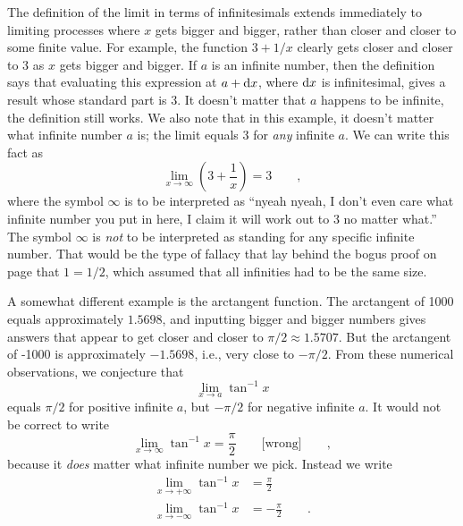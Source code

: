 The definition of the limit in terms of infinitesimals extends immediately to limiting
processes where $x$ gets bigger and bigger, rather than closer and closer to some
finite value. For example, the function $3+1/x$ clearly gets closer and closer to
3 as $x$ gets bigger and bigger. If $a$ is an infinite number, then the definition
says that evaluating this expression at $a+\textup{d} x$, where $\textup{d} x$ is infinitesimal,
gives a result whose standard part is 3. It doesn't matter that $a$ happens to be
infinite, the definition still works. We also note that in this example, it doesn't
matter what infinite number $a$ is; the limit equals 3 for \emph{any} infinite $a$.
We can write this fact as
\begin{equation*}
   \lim_{x\rightarrow \infty} \left(3+\frac{1}{x}\right) =3 \qquad ,
\end{equation*}
where the symbol $\infty$ is to be interpreted as ``nyeah nyeah, I don't even care
what infinite number you put in here, I claim it will work out to 3 no matter what.''
The symbol $\infty$ is \emph{not} to be interpreted as standing for any specific
infinite number. That would be the type of fallacy that lay behind the bogus proof
on page \pageref{bogus-proof} that $1=1/2$, which assumed that all infinities had to be
the same size.

A somewhat different example is the arctangent function. The arctangent of 1000 equals
approximately $1.5698$, and inputting bigger and bigger numbers gives answers that appear
to get closer and closer to $\pi/2\approx1.5707$. But the arctangent
of -1000 is approximately $-1.5698$, i.e., very close to $-\pi/2$.
From these numerical
observations, we conjecture that
\begin{equation*}
   \lim_{x\rightarrow a} \tan^{-1} x
\end{equation*}
equals $\pi/2$ for positive infinite $a$, but $-\pi/2$ for negative infinite $a$.
It would not be correct to write
\begin{equation*}
   \lim_{x\rightarrow \infty} \tan^{-1} x = \frac{\pi}{2} \qquad \text{[wrong]} \qquad ,
\end{equation*}
because it \emph{does} matter what infinite number we pick. Instead we write
\begin{align*}
   \lim_{x\rightarrow +\infty} \tan^{-1} x &= \frac{\pi}{2} \\
   \lim_{x\rightarrow -\infty} \tan^{-1} x &= -\frac{\pi}{2} \qquad .
\end{align*}

